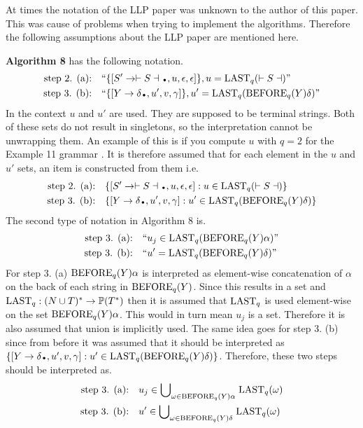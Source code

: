 At times the notation of the LLP paper \cite{Vagner2007} was unknown to the author of this paper. This was cause of problems when trying to implement the algorithms. Therefore the following assumptions about the LLP paper \cite{Vagner2007} are mentioned here.

\textbf{Algorithm 8} \cite[13]{Vagner2007} has the following notation.
\begin{align*}
    \text{step 2. (a):}& \quad \text{``}\{[S' \to \vdash S \dashv \bigdot , u, \epsilon, \epsilon]\}, u = \LAST_q(\vdash S \dashv)\text{''} \\
    \text{step 3. (b):}& \quad \text{``}\{[Y \to \delta \bigdot , u', v, \gamma]\}, u' = \LAST_q(\BEFORE_q(Y)\delta)\text{''}
\end{align*}    
In the context $u$ and $u'$ are used. They are supposed to be terminal strings. Both of these sets do not result in singletons, so the interpretation cannot be unwrapping them. An example of this is if you compute $u$ with $q=2$ for the Example 11 grammar \cite[14]{Vagner2007}. It is therefore assumed that for each element in the $u$ and $u'$ sets, an item is constructed from them i.e.
\begin{align*}
    \text{step 2. (a):}& \quad \{[S' \to \vdash S \dashv \bigdot, u, \epsilon, \epsilon] : u \in \LAST_q(\vdash S \dashv)\} \\
    \text{step 3. (b):}& \quad \{[Y \to \delta \bigdot , u', v, \gamma] : u' \in \LAST_q(\BEFORE_q(Y)\delta)\}
\end{align*}
The second type of notation in Algorithm 8 is.
\begin{align*}
    \text{step 3. (a):}& \quad \text{``} u_j \in \text{LAST}_q(\text{BEFORE}_q(Y) \alpha)\text{''} \\
    \text{step 3. (b):}& \quad \text{``} u' = \text{LAST}_q(\text{BEFORE}_q(Y)\delta)\text{''}
\end{align*}    
For step 3. (a) $\text{BEFORE}_q(Y) \alpha$ is interpreted as element-wise concatenation of $\alpha$ on the back of each string in $\text{BEFORE}_q(Y)$. Since this results in a set and $\text{LAST}_q: (N \cup T)^* \to \mathbb{P}(T^*)$ then it is assumed that $\text{LAST}_q$ is used element-wise on the set $\text{BEFORE}_q(Y) \alpha$. This would in turn mean $u_j$ is a set. Therefore it is also assumed that union is implicitly used. The same idea goes for step 3. (b) since from before it was assumed that it should be interpreted as $\{[Y \to \delta \bigdot , u', v, \gamma] : u' \in \LAST_q(\BEFORE_q(Y)\delta)\}$. Therefore, these two steps should be interpreted as.
\begin{align*}
    \text{step 3. (a):}& \quad u_j \in \text{$\bigcup$}_{\omega \in \text{BEFORE}_q(Y) \alpha} \; \text{LAST}_q(\omega) \\
    \text{step 3. (b):}& \quad  u' \in \text{$\bigcup$}_{\omega \in \text{BEFORE}_q(Y) \delta} \; \text{LAST}_q(\omega)
\end{align*}
